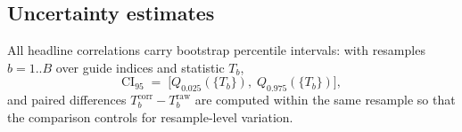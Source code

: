 \subsection{Uncertainty estimates}
All headline correlations carry bootstrap percentile intervals: with
resamples $b = 1..B$ over guide indices and statistic $T_b$,
\begin{equation}
\mathrm{CI}_{95} \;=\; \big[ Q_{0.025}(\{T_b\}),\; Q_{0.975}(\{T_b\}) \big],
\label{eq:boot}
\end{equation}
and paired differences $T_b^{\mathrm{corr}} - T_b^{\mathrm{raw}}$ are
computed within the same resample so that the comparison controls for
resample-level variation.
